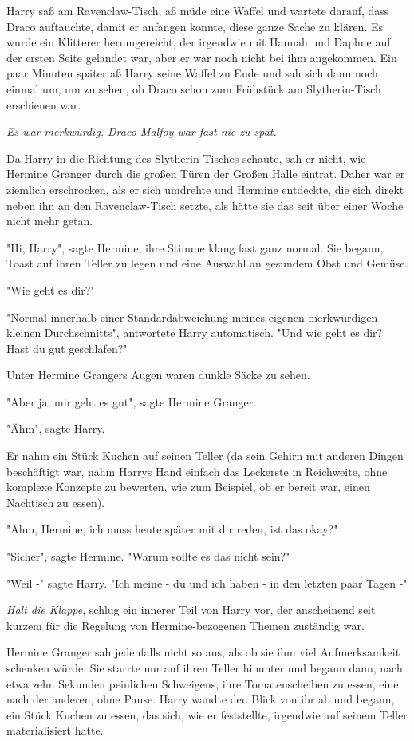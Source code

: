 {Harry saß am Ravenclaw-Tisch, aß müde eine Waffel und wartete darauf, dass Draco auftauchte, damit er anfangen konnte, diese ganze Sache zu klären. Es wurde ein Klitterer herumgereicht, der irgendwie mit Hannah und Daphne auf der ersten Seite gelandet war, aber er war noch nicht bei ihm angekommen. Ein paar Minuten später aß Harry seine Waffel zu Ende und sah sich dann noch einmal um, um zu sehen, ob Draco schon zum Frühstück am Slytherin-Tisch erschienen war.

\emph{Es war merkwürdig. Draco Malfoy war fast nie zu spät.}

Da Harry in die Richtung des Slytherin-Tisches schaute, sah er nicht, wie Hermine Granger durch die großen Türen der Großen Halle eintrat. Daher war er ziemlich erschrocken, als er sich umdrehte und Hermine entdeckte, die sich direkt neben ihn an den Ravenclaw-Tisch setzte, als hätte sie das seit über einer Woche nicht mehr getan.

"Hi, Harry", sagte Hermine, ihre Stimme klang fast ganz normal. Sie begann, Toast auf ihren Teller zu legen und eine Auswahl an gesundem Obst und Gemüse.

"Wie geht es dir?"

"Normal innerhalb einer Standardabweichung meines eigenen merkwürdigen kleinen Durchschnitts", antwortete Harry automatisch. "Und wie geht es dir? Hast du gut geschlafen?"

Unter Hermine Grangers Augen waren dunkle Säcke zu sehen.

"Aber ja, mir geht es gut", sagte Hermine Granger.

"Ähm", sagte Harry.

Er nahm ein Stück Kuchen auf seinen Teller (da sein Gehirn mit anderen Dingen beschäftigt war, nahm Harrys Hand einfach das Leckerste in Reichweite, ohne komplexe Konzepte zu bewerten, wie zum Beispiel, ob er bereit war, einen Nachtisch zu essen).

"Ähm, Hermine, ich muss heute später mit dir reden, ist das okay?"

"Sicher", sagte Hermine. "Warum sollte es das nicht sein?"

"Weil -" sagte Harry. "Ich meine - du und ich haben - in den letzten paar Tagen -"

\emph{Halt die Klappe}, schlug ein innerer Teil von Harry vor, der anscheinend seit kurzem für die Regelung von Hermine-bezogenen Themen zuständig war.

Hermine Granger sah jedenfalls nicht so aus, als ob sie ihm viel Aufmerksamkeit schenken würde. Sie starrte nur auf ihren Teller hinunter und begann dann, nach etwa zehn Sekunden peinlichen Schweigens, ihre Tomatenscheiben zu essen, eine nach der anderen, ohne Pause. Harry wandte den Blick von ihr ab und begann, ein Stück Kuchen zu essen, das sich, wie er feststellte, irgendwie auf seinem Teller materialisiert hatte.

}
